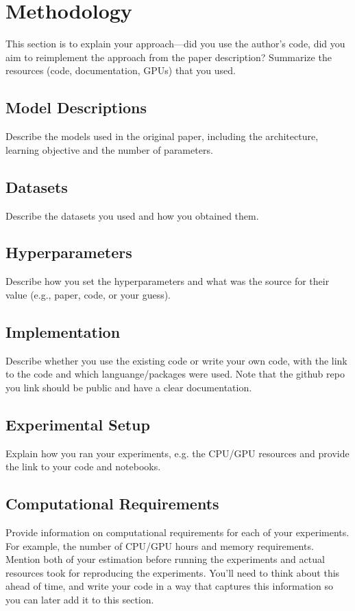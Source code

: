 \documentclass{article}
\begin{document}
\section{Methodology}

This section is to explain your approach---did you use the author's code, did you aim to reimplement the approach from the paper description? Summarize the resources (code, documentation, GPUs) that you used. 

\subsection{Model Descriptions}
Describe the models used in the original paper, including the architecture, learning objective and the number of parameters.

\subsection{Datasets}
Describe the datasets you used and how you obtained them. 

\subsection{Hyperparameters}
Describe how you set the hyperparameters and what was the source for their value (e.g., paper, code, or your guess). 

\subsection{Implementation}
Describe whether you use the existing code or write your own code, with the link to the code and which languange/packages were used. Note that the github repo you link should be public and have a clear documentation.

\subsection{Experimental Setup}
Explain how you ran your experiments, e.g. the CPU/GPU resources and provide the link to your code and notebooks. 

\subsection{Computational Requirements}
Provide information on computational requirements for each of your experiments. For example, the number of CPU/GPU hours and memory requirements.
Mention both of your estimation before running the experiments and actual resources took for reproducing the experiments. 
You'll need to think about this ahead of time, and write your code in a way that captures this information so you can later add it to this section. 
\end{document}

